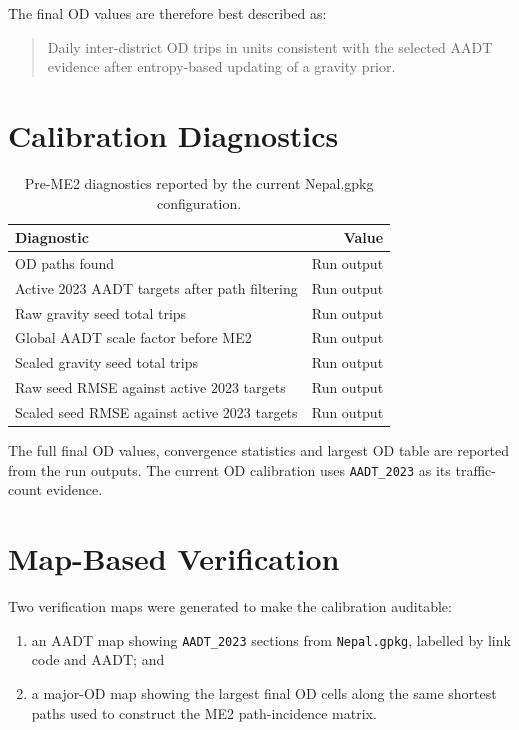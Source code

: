 \documentclass[11pt,a4paper]{article}
\begin{document}
The final OD values are therefore best described as:

\begin{quote}
Daily inter-district OD trips in units consistent with the selected AADT
evidence after entropy-based updating of a gravity prior.
\end{quote}

\section{Calibration Diagnostics}

\begin{table}[H]
\centering
\caption{Pre-ME2 diagnostics reported by the current Nepal.gpkg configuration.}
\begin{tabular}{lr}
\toprule
\textbf{Diagnostic} & \textbf{Value} \\
\midrule
OD paths found & Run output \\
Active 2023 AADT targets after path filtering & Run output \\
Raw gravity seed total trips & Run output \\
Global AADT scale factor before ME2 & Run output \\
Scaled gravity seed total trips & Run output \\
Raw seed RMSE against active 2023 targets & Run output \\
Scaled seed RMSE against active 2023 targets & Run output \\
\bottomrule
\end{tabular}
\end{table}

The full final OD values, convergence statistics and largest OD table are
reported from the run outputs. The current OD calibration uses
\texttt{AADT\_2023} as its traffic-count evidence.

\section{Map-Based Verification}

Two verification maps were generated to make the calibration auditable:

\begin{enumerate}
    \item an AADT map showing \texttt{AADT\_2023} sections from
    \texttt{Nepal.gpkg}, labelled by link code and AADT; and
    \item a major-OD map showing the largest final OD cells along the same
    shortest paths used to construct the ME2 path-incidence matrix.
\end{enumerate}
\end{document}
